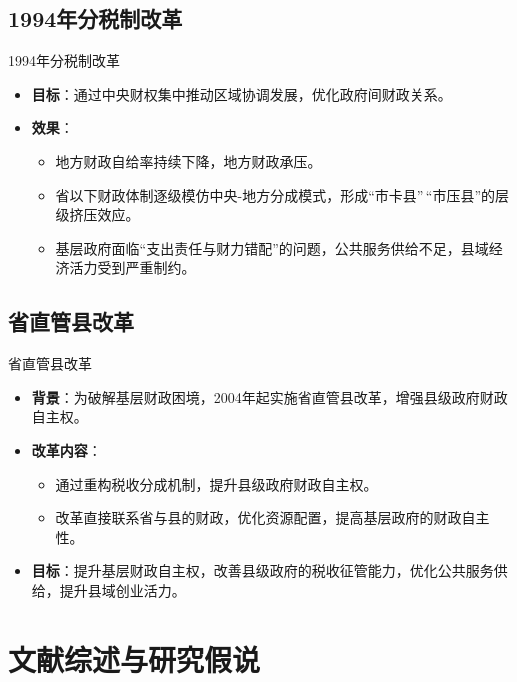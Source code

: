 \documentclass{beamer}
\newcommand{\tightlist}{%
  \setlength{\itemsep}{0pt}\setlength{\parskip}{0pt}}
\begin{document}
\subsection{1994年分税制改革}\label{ux5e74ux5206ux7a0eux5236ux6539ux9769}

\begin{frame}{1994年分税制改革}
\begin{itemize}
\tightlist
\item
  \textbf{目标}：通过中央财权集中推动区域协调发展，优化政府间财政关系。
\item
  \textbf{效果}：

  \begin{itemize}
  \tightlist
  \item
    地方财政自给率持续下降，地方财政承压。
  \item
    省以下财政体制逐级模仿中央-地方分成模式，形成``市卡县''\,``市压县''的层级挤压效应。
  \item
    基层政府面临``支出责任与财力错配''的问题，公共服务供给不足，县域经济活力受到严重制约。
  \end{itemize}
\end{itemize}
\end{frame}

\subsection{省直管县改革}\label{ux7701ux76f4ux7ba1ux53bfux6539ux9769}

\begin{frame}{省直管县改革}
\begin{itemize}
\tightlist
\item
  \textbf{背景}：为破解基层财政困境，2004年起实施省直管县改革，增强县级政府财政自主权。
\item
  \textbf{改革内容}：

  \begin{itemize}
  \tightlist
  \item
    通过重构税收分成机制，提升县级政府财政自主权。
  \item
    改革直接联系省与县的财政，优化资源配置，提高基层政府的财政自主性。
  \end{itemize}
\item
  \textbf{目标}：提升基层财政自主权，改善县级政府的税收征管能力，优化公共服务供给，提升县域创业活力。
\end{itemize}
\end{frame}

\section{文献综述与研究假说}\label{ux6587ux732eux7efcux8ff0ux4e0eux7814ux7a76ux5047ux8bf4}
\end{document}
